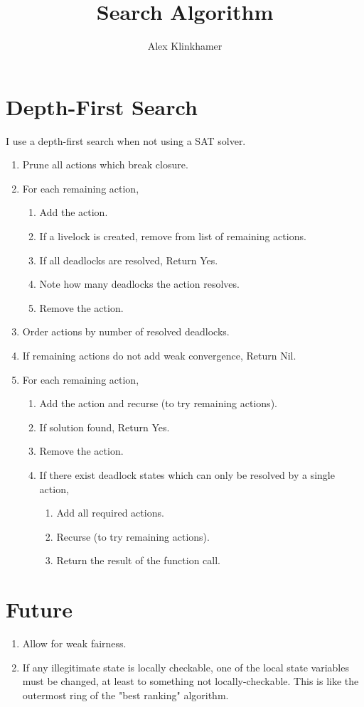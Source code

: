 



\title{Search Algorithm}
\author{Alex Klinkhamer}
\maketitle

\section{Depth-First Search}
I use a depth-first search when not using a SAT solver.

\begin{enumerate}
 \item Prune all actions which break closure.
 \item For each remaining action,
  \begin{enumerate}
   \item Add the action.
   \item If a livelock is created, remove from list of remaining actions.
   \item If all deadlocks are resolved, Return Yes.
   \item Note how many deadlocks the action resolves.
   \item Remove the action.
  \end{enumerate}
 \item Order actions by number of resolved deadlocks.
 \item If remaining actions do not add weak convergence, Return Nil.
 \item For each remaining action,
  \begin{enumerate}
   \item Add the action and recurse (to try remaining actions).
   \item If solution found, Return Yes.
   \item Remove the action.
   \item If there exist deadlock states which can only be resolved by a single action,
    \begin{enumerate}
     \item Add all required actions.
     \item Recurse (to try remaining actions).
     \item Return the result of the function call.
    \end{enumerate}
  \end{enumerate}
\end{enumerate}

\section{Future}
\begin{enumerate}
 \item Allow for weak fairness.
 \item If any illegitimate state is locally checkable, one of the local state variables must be changed, at least to something not locally-checkable.
  This is like the outermost ring of the "best ranking" algorithm.
\end{enumerate}



